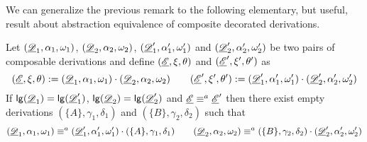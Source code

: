 We can generalize the previous remark to the following elementary, but useful, result about abstraction equivalence of composite decorated derivations. 
\begin{lemma}\label{rem:obv}
	Let  $(\underline{\mathscr{D}}_1, \alpha_1, \omega_1)$, $(\underline{\mathscr{D}}_2, \alpha_2, \omega_2)$, $(\underline{\mathscr{D}}'_1, \alpha'_1, \omega'_1)$ and $(\underline{\mathscr{D}}'_2, \alpha'_2, \omega'_2)$ be two pairs of composable derivations and define $(\underline{\mathscr{E}}, \xi, \theta)$ and $(\underline{\mathscr{E}}', \xi', \theta')$ as 
	\[(\underline{\mathscr{E}}, \xi, \theta):=(\underline{\mathscr{D}}_1, \alpha_1, \omega_1) \cdot (\underline{\mathscr{D}}_2, \alpha_2, \omega_2) \qquad (\underline{\mathscr{E}}', \xi', \theta'):=(\underline{\mathscr{D}}'_1, \alpha'_1, \omega'_1) \cdot (\underline{\mathscr{D}}'_2, \alpha'_2, \omega'_2)\]
	 If $\mathsf{lg}(\underline{\mathscr{D}}_1)=\mathsf{lg}(\underline{\mathscr{D}}'_1)$, $\mathsf{lg}(\underline{\mathscr{D}}_2)=\mathsf{lg}(\underline{\mathscr{D}}'_2)$ and $\underline{\mathscr{E}}\equiv^a \underline{\mathscr{E}}'$  then there exist empty derivations $(\{A\}, \gamma_1, \delta_1)$ and $(\{B\}, \gamma_2, \delta_2)$ such that
	 \[(\underline{\mathscr{D}}_1, \alpha_1, \omega_1) \equiv^a (\underline{\mathscr{D}}'_1, \alpha'_1, \omega'_1) \cdot  (\{A\}, \gamma_1, \delta_1) \qquad (\underline{\mathscr{D}}_2, \alpha_2, \omega_2) \equiv^a (\{B\}, \gamma_2, \delta_2)\cdot (\underline{\mathscr{D}}'_2, \alpha'_2, \omega'_2)  \]
\end{lemma}
